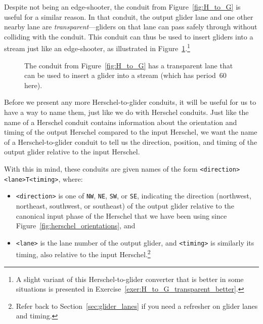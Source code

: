 Despite not being an edge-shooter, the conduit from Figure~\ref{fig:H_to_G} is useful for a similar reason. In that conduit, the output glider lane and one other nearby lane are \emph{transparent}---gliders on that lane can pass safely through without colliding with the conduit. This conduit can thus be used to insert gliders into a stream just like an edge-shooter, as illustrated in Figure~\ref{fig:transparent_lane}.\footnote{A slight variant of this Herschel-to-glider converter that is better in some situations is presented in Exercise~\ref{exer:H_to_G_transparent_better}.}

\begin{figure}[!htb]
	\centering
	\caption{The conduit from Figure~\ref{fig:H_to_G} has a transparent lane that can be used to insert a glider into a stream (which has period~$60$ here).}\label{fig:transparent_lane}
\end{figure}

Before we present any more Herschel-to-glider conduits, it will be useful for us to have a way to name them, just like we do with Herschel conduits. Just like the name of a Herschel conduit contains information about the orientation and timing of the output Herschel compared to the input Herschel, we want the name of a Herschel-to-glider conduit to tell us the direction, position, and timing of the output glider relative to the input Herschel.

With this in mind, these conduits are given names of the form \verb|<direction><lane>T<timing>|, where:\smallskip

\begin{itemize}
	\item \verb|<direction>| is one of \verb|NW|, \verb|NE|, \verb|SW|, or \verb|SE|, indicating the direction (northwest, northeast, southwest, or southeast) of the output glider relative to the canonical input phase of the Herschel that we have been using since Figure~\ref{fig:herschel_orientations}, and\smallskip
	
	\item \verb|<lane>| is the lane number of the output glider, and \verb|<timing>| is similarly its timing, also relative to the input Herschel.\footnote{Refer back to Section~\ref{sec:glider_lanes} if you need a refresher on glider lanes and timing.}\smallskip
\end{itemize}

